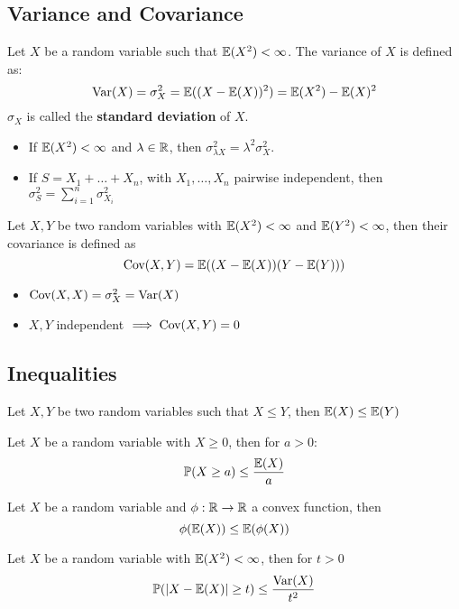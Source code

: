 \subsection{Variance and Covariance}
\begin{definition*}[Variance]
  Let \(X\) be a random variable such that \(\mathbb{E}(X^2) < \infty\). The variance of \(X\) is defined as:
  \[\text{Var}(X) = \sigma_X^2 = \mathbb{E}((X - \mathbb{E}(X))^2) = \mathbb{E}(X^2) - \mathbb{E}(X)^2\]
  \(\sigma_X\) is called the \textbf{standard deviation} of \(X\).
\end{definition*}

\begin{itemize}
  \item If \(\mathbb{E}(X^2) < \infty\) and \(\lambda \in \mathbb{R}\), then \(\sigma_{\lambda X}^2 = \lambda^2 \sigma_X^2\).
  \item If \(S = X_1 + \ldots + X_n\), with \(X_1, \ldots, X_n\) pairwise independent, then \(\sigma_S^2 = \sum_{i = 1}^n \sigma_{X_i}^2\)
\end{itemize}

\begin{definition*}[Covariance]
  Let \(X, Y\) be two random variables with \(\mathbb{E}(X^2) < \infty\) and \(\mathbb{E}(Y^2) < \infty\), then their covariance is defined as
  \[\text{Cov}(X, Y) = \mathbb{E}((X - \mathbb{E}(X))(Y - \mathbb{E}(Y)))\]
\end{definition*}
\begin{itemize}
  \item \(\text{Cov}(X, X) = \sigma_X^2 = \text{Var}(X)\)
  \item \(X, Y\) independent \(\implies \text{Cov}(X, Y) = 0\) 
\end{itemize}

\subsection{Inequalities}
\begin{lemma}[Monotonicity]
  Let \(X, Y\) be two random variables such that \(X \leq Y\), then \(\mathbb{E}(X) \leq \mathbb{E}(Y)\)
\end{lemma}

\begin{theorem*}
  Let \(X\) be a random variable with \(X \geq 0\), then for \(a > 0\):
  \[\mathbb{P}(X \geq a) \leq \frac{\mathbb{E}(X)}{a}\]
\end{theorem*}

\begin{theorem*}
  Let \(X\) be a random variable and \(\phi: \mathbb{R} \to \mathbb{R}\) a convex function, then
  \[\phi(\mathbb{E}(X)) \leq \mathbb{E}(\phi(X))\]
\end{theorem*}

\begin{theorem*}
  Let \(X\) be a random variable with \(\mathbb{E}(X^2) < \infty\), then for \(t > 0\)
  \[\mathbb{P}(|X - \mathbb{E}(X)| \geq t) \leq \frac{\text{Var}(X)}{t^2}\]
\end{theorem*}
